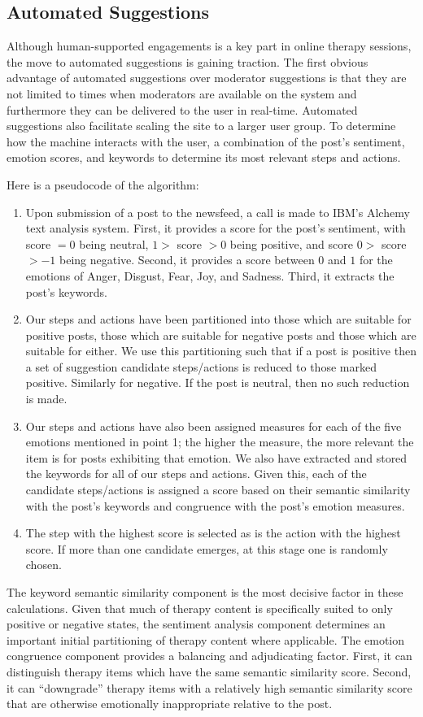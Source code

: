 \documentclass[11pt,technote,twocolumn]{IEEEtran}
\begin{document}
\subsection{Automated Suggestions}
Although human-supported engagements is a key part in online therapy sessions, the move to automated suggestions is gaining traction. The first obvious advantage of automated suggestions over moderator suggestions is that they are not limited to times when moderators are available on the system and furthermore they can be delivered to the user in real-time. Automated suggestions also facilitate scaling the site to a larger user group. \cite{Alfonso} To determine how the machine interacts with the user, a combination of the post's sentiment, emotion scores, and keywords to determine its most relevant steps and actions.
\par
Here is a pseudocode of the algorithm:
\begin{enumerate}
    \item Upon submission of a post to the newsfeed, a call is made to IBM's Alchemy text analysis system. First, it provides a score for the post's sentiment, with score $= 0$ being neutral, $1 >$ score $> 0$ being positive, and score $0 >$ score $> −1$ being negative. Second, it provides a score between $0$ and $1$ for the emotions of Anger, Disgust, Fear, Joy, and Sadness. Third, it extracts the post's keywords.
    \item Our steps and actions have been partitioned into those which are suitable for positive posts, those which are suitable for negative posts and those which are suitable for either. We use this partitioning such that if a post is positive then a set of suggestion candidate steps/actions is reduced to those marked positive. Similarly for negative. If the post is neutral, then no such reduction is made.
    \item Our steps and actions have also been assigned measures for each of the five emotions mentioned in point 1; the higher the measure, the more relevant the item is for posts exhibiting that emotion. We also have extracted and stored the keywords for all of our steps and actions. Given this, each of the candidate steps/actions is assigned a score based on their semantic similarity with the post's keywords and congruence with the post's emotion measures.
    \item The step with the highest score is selected as is the action with the highest score. If more than one candidate emerges, at this stage one is randomly chosen.
\end{enumerate}
The keyword semantic similarity component is the most decisive factor in these calculations. Given that much of therapy content is specifically suited to only positive or negative states, the sentiment analysis component determines an important initial partitioning of therapy content where applicable. The emotion congruence component provides a balancing and adjudicating factor. First, it can distinguish therapy items which have the same semantic similarity score. Second, it can ``downgrade” therapy items with a relatively high semantic similarity score that are otherwise emotionally inappropriate relative to the post. \cite{Alfonso}
\end{document}
